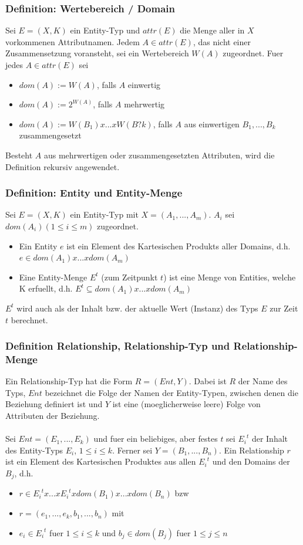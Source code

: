 \documentclass[a4paper,10pt]{article}
\begin{document}
\subsubsection{Definition: Wertebereich / Domain}
Sei $E = (X, K)$ ein Entity-Typ und $attr(E)$ die Menge aller in $X$ vorkommenen Attributnamen. Jedem $A \in attr(E)$, das nicht einer Zusammensetzung voransteht, sei ein Wertebereich $W(A)$ zugeordnet. Fuer jedes $A \in attr(E)$ sei
\begin{itemize}
\item $dom(A) := W(A)$, falls $A$ einwertig
\item $dom(A) := 2^{W(A)}$, falls $A$ mehrwertig
\item $dom(A) := W(B_1) x ... x W(B?k)$, falls $A$ aus einwertigen $B_1, ..., B_k$ zusammengesetzt
\end{itemize}
Besteht $A$ aus mehrwertigen oder zusammengesetzten Attributen, wird die Definition rekursiv angewendet.

\subsubsection{Definition: Entity und Entity-Menge}
Sei $E = (X, K)$ ein Entity-Typ mit $X = (A_1, ..., A_m)$. $A_i$ sei $dom(A_i) (1 \leq i \leq m)$ zugeordnet.
\begin{itemize}
\item Ein Entity $e$ ist ein Element des Kartesischen Produkts aller Domains, d.h. $e \in dom(A_1) x ... x dom(A_m)$
\item Eine Entity-Menge $E^{t}$ (zum Zeitpunkt $t$) ist eine Menge von Entities, welche K erfuellt, d.h. $E^{t} \subseteq dom(A_1) x ... x dom(A_m)$
\end{itemize}
$E^{t}$ wird auch als der Inhalt bzw. der aktuelle Wert (Instanz) des Typs $E$ zur Zeit $t$ berechnet.

\subsubsection{Definition Relationship, Relationship-Typ und Relationship-Menge}
Ein Relationship-Typ hat die Form $R = (Ent, Y)$. Dabei ist $R$ der Name des Typs, $Ent$ bezeichnet die Folge der Namen der Entity-Typen, zwischen denen die Beziehung definiert ist und $Y$ ist eine (moeglicherweise leere) Folge von Attributen der Beziehung.
\\~\\
Sei $Ent = (E_1, ..., E_k)$ und fuer ein beliebiges, aber festes $t$ sei ${E_i}^t$ der Inhalt des Entity-Typs $E_i$, $1 \leq i \leq k$. Ferner sei $Y = (B_1, ..., B_n)$. Ein Relationship $r$ ist ein Element des Kartesischen Produktes aus allen ${E_i}^t$ und den Domains der $B_j$, d.h.
\begin{itemize}
\item $r \in {E_i}^t x ... x {E_i}^t x dom(B_1) x ... x dom(B_n)$ bzw
\item $r = (e_1, ..., e_k, b_1, ..., b_n)$ mit
\item $e_i \in {E_i}^t$ fuer $1 \leq i \leq k$ und $b_j \in dom(B_j)$ fuer $1 \leq j \leq n$
\end{itemize}
\end{document}
